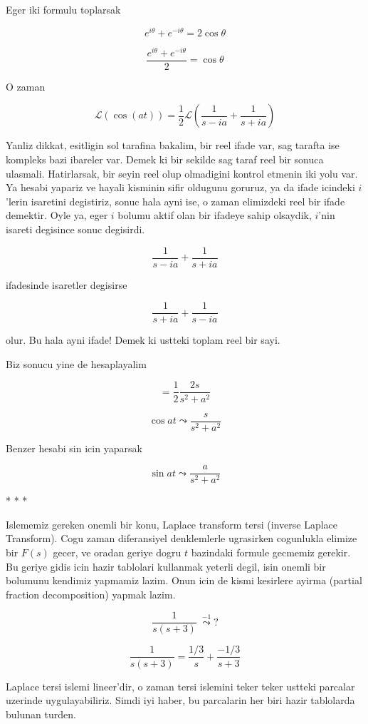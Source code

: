\documentclass[12pt,fleqn]{article}\usepackage{../common}
\begin{document}
Eger iki formulu toplarsak

\[ e^{i\theta} + e^{-i\theta} = 2 \cos\theta \]

\[ \frac{e^{i\theta} + e^{-i\theta}}{2} = \cos\theta \]

O zaman 

\[ \mathcal{L}(\cos(at)) = \frac{1}{2} \mathcal{L} 
(\frac{1}{s-ia} + \frac{1}{s+ia} )
\]

Yanliz dikkat, esitligin sol tarafina bakalim, bir reel ifade var, sag
tarafta ise kompleks bazi ibareler var. Demek ki bir sekilde sag taraf reel
bir sonuca ulasmali. Hatirlarsak, bir seyin reel olup olmadigini kontrol
etmenin iki yolu var. Ya hesabi yapariz ve hayali kisminin sifir oldugunu
goruruz, ya da ifade icindeki $i$'lerin isaretini degistiriz, sonuc hala
ayni ise, o zaman elimizdeki reel bir ifade demektir. Oyle ya, eger $i$
bolumu aktif olan bir ifadeye sahip olsaydik, $i$'nin isareti degisince
sonuc degisirdi. 

\[ \frac{1}{s-ia} + \frac{1}{s+ia} \]

ifadesinde isaretler degisirse 

\[ \frac{1}{s+ia} + \frac{1}{s-ia} \]

olur. Bu hala ayni ifade! Demek ki ustteki toplam reel bir sayi. 

Biz sonucu yine de hesaplayalim

\[ = \frac{1}{2}\frac{2s}{s^2+a^2} \]

\[ \cos at \leadsto \frac{s}{s^2+a^2} \]

Benzer hesabi sin icin yaparsak 

\[ \sin at \leadsto \frac{a}{s^2 + a^2} \]


* * * 

Islememiz gereken onemli bir konu, Laplace transform tersi (inverse Laplace
Transform). Cogu zaman diferansiyel denklemlerle ugrasirken cogunlukla
elimize bir $F(s)$ gecer, ve oradan geriye dogru $t$ bazindaki formule
gecmemiz gerekir. Bu geriye gidis icin hazir tablolari kullanmak yeterli
degil, isin onemli bir bolumunu kendimiz yapmamiz lazim. Onun icin de kismi
kesirlere ayirma (partial fraction decomposition) yapmak lazim.  

\[ \frac{1}{s(s+3)} \  \stackrel{-1}{\leadsto} ? \]


\[ \frac{1}{s(s+3)} = 
\frac{1/3}{s} + \frac{-1/3}{s+3}
\]

Laplace tersi islemi lineer'dir, o zaman tersi islemini teker teker ustteki
parcalar uzerinde uygulayabiliriz. Simdi iyi haber, bu parcalarin her biri
hazir tablolarda bulunan turden. 
\end{document}
